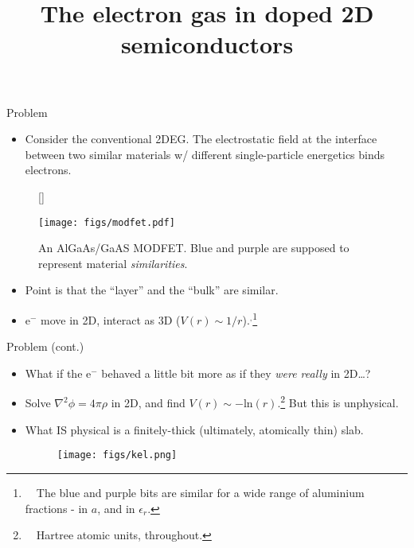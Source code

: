 \documentclass[10pt, pdf, hyperref={draft}, usenames, dvipsnames]{beamer}
\title{{\LARGE The electron gas in doped 2D semiconductors}}
\institute[]{\normalsize
  Ryan Hunt \\
  CMT Seminar \\
  20$^{\text{th}}$ June
}
\date{}
\begin{document}
\begin{frame}[plain]
  \titlepage
\end{frame}



\begin{frame}{Problem}
\begin{itemize}
  \item Consider the conventional 2DEG. The electrostatic field at the
  interface between two similar materials w/ different single-particle
  energetics binds electrons.
\end{itemize}

\begin{figure}[H]
  [\FBwidth]
  {\caption{An AlGaAs/GaAS MODFET. Blue and purple are supposed to represent
  material \textit{similarities}.}\label{fig:modfet}}
  {\texttt{[image: figs/modfet.pdf]}}
\end{figure}

\begin{itemize}
  \item Point is that the ``layer'' and the ``bulk'' are similar.
  \item e$^{-}$ move in 2D, interact as 3D
  ($V(r)\sim1/r$).$^{,}$\footnote{~~The blue and purple
  bits are similar for a wide range of aluminium fractions - in $a$, and in
  $\epsilon_r$.}
\end{itemize}

\end{frame}

\begin{frame}{Problem (cont.)}

\begin{itemize}

  \item What if the e$^{-}$ behaved a little bit more as if they \textit{were
  really} in 2D\ldots?
  \item Solve $\nabla^{2}\phi = 4\pi\rho $ in 2D, and find
  $V(r)\sim-\text{ln}{(r)}$.\footnote{~~Hartree atomic units, throughout.} But
  this is unphysical.
  \item What IS physical is a finitely-thick (ultimately, atomically thin)
  slab.

  \begin{figure}[H]
    \centering
    \texttt{[image: figs/kel.png]}
  \end{figure}

\end{itemize}
\end{frame}
\end{document}
